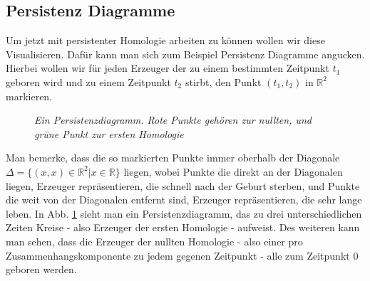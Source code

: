 \documentclass[11pt, a4paper,draft]{report}
\newcommand{\bR}{\mathbb{R}}
\begin{document}
	\subsection{Persistenz Diagramme}
	
	Um jetzt mit persistenter Homologie arbeiten zu können wollen wir diese Visualisieren. Dafür kann man sich zum Beispiel Persistenz Diagramme angucken. Hierbei wollen wir für jeden Erzeuger der zu einem bestimmten Zeitpunkt $t_1$ geboren wird und zu einem Zeitpunkt $t_2$ stirbt, den Punkt $(t_1,t_2)$ in $\bR^2$ markieren.\\
	\begin{figure}
		\centering
	\caption{\textit{Ein Persistenzdiagramm. Rote Punkte gehören zur nullten, und grüne Punkt zur ersten Homologie}}
\label{fig2}
	\end{figure}

	 Man bemerke, dass die so markierten Punkte immer oberhalb der Diagonale $\Delta=\{(x,x)\in\bR^2|x\in\bR\}$ liegen, wobei Punkte die direkt an der Diagonalen liegen, Erzeuger repräsentieren, die schnell nach der Geburt sterben, und Punkte die weit von der Diagonalen entfernt sind, Erzeuger repräsentieren, die sehr lange leben. In Abb. \ref{fig2} sieht man ein Persistenzdiagramm, das zu drei unterschiedlichen Zeiten Kreise - also Erzeuger der ersten Homologie - aufweist. Des weiteren kann man sehen, dass die Erzeuger der nullten Homologie - also einer pro Zusammenhangskomponente zu jedem gegenen Zeitpunkt - alle zum Zeitpunkt 0 geboren werden. 
\end{document}
